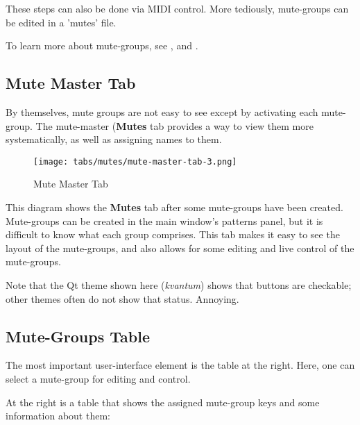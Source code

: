    These steps can also be done via MIDI control.
   More tediously, mute-groups can be edited in a 'mutes' file.

   To learn more about mute-groups, see
   , and
   .

\subsection{Mute Master Tab}
\label{sec:mutes_mute_master_tab}

   By themselves, mute groups are not easy to see except by activating
   each mute-group.
   The mute-master (\textbf{Mutes} tab provides a way to view
   them more systematically, as well as assigning names to them.


\begin{figure}[H]
   \centering 
   \texttt{[image: tabs/mutes/mute-master-tab-3.png]}
   \caption{Mute Master Tab}
   \label{fig:mutes_master_tab}
\end{figure}

   This diagram shows the \textbf{Mutes} tab after some mute-groups have been
   created.  Mute-groups can be created in the main window's patterns panel,
   but it is difficult to know what each group comprises.
   This tab makes it
   easy to see the layout of the mute-groups, and also allows for some editing
   and live control of the mute-groups.

   Note that the Qt theme shown here (\textsl{kvantum})
   shows that buttons are checkable; other themes often do not show that status.
   Annoying.

\subsection{Mute-Groups Table}
\label{sec:mutes_mute_groups_table}

   The most important user-interface element is the table at the right.
   Here, one can select a mute-group for editing and control.

   \setcounter{ItemCounter}{0}      %

   At the right is a table that shows the assigned mute-group keys and
   some information about them:

